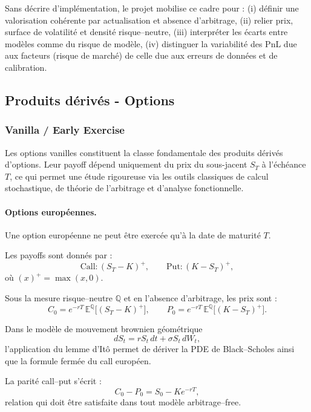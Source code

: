 \documentclass[11pt,a4paper]{article}
\newcommand{\1}{\mathbf{1}}
\begin{document}
Sans d\'ecrire d'impl\'ementation, le projet mobilise ce cadre pour : (i) d\'efinir une valorisation coh\'erente
par actualisation et absence d'arbitrage, (ii) relier prix, surface de volatilité et densit\'e risque--neutre,
(iii) interpr\'eter les \'ecarts entre mod\`eles comme du risque de mod\`ele, (iv) distinguer la variabilit\'e
des PnL due aux facteurs (risque de march\'e) de celle due aux erreurs de donn\'ees et de calibration.

\subsection{Produits d\'eriv\'es - Options}

\subsubsection{Vanilla / Early Exercise}

Les options vanilles constituent la classe fondamentale des produits dérivés d'options.
Leur payoff dépend uniquement du prix du sous-jacent $S_T$ à l'échéance $T$, ce qui permet
une étude rigoureuse via les outils classiques de calcul stochastique, de théorie de l'arbitrage
et d'analyse fonctionnelle.

\paragraph{Options européennes.}

Une option européenne ne peut être exercée qu'à la date de maturité $T$.

Les payoffs sont donnés par :
\[
\text{Call} : (S_T - K)^+,
\qquad
\text{Put} : (K - S_T)^+,
\]
où $(x)^+ = \max(x,0)$.

Sous la mesure risque--neutre $\mathbb{Q}$ et en l'absence d'arbitrage, les prix sont :
\[
C_0 = e^{-rT}\,\mathbb{E}^{\mathbb{Q}}\big[(S_T-K)^+\big],
\qquad
P_0 = e^{-rT}\,\mathbb{E}^{\mathbb{Q}}\big[(K-S_T)^+\big].
\]

Dans le modèle de mouvement brownien géométrique
\[
dS_t = r S_t\,dt + \sigma S_t\, dW_t,
\]
l'application du lemme d'Itô permet de dériver la PDE de Black--Scholes ainsi que la formule
fermée du call européen.

La parité call--put s'écrit :
\[
C_0 - P_0 = S_0 - K e^{-rT},
\]
relation qui doit être satisfaite dans tout modèle arbitrage--free.

\end{document}
